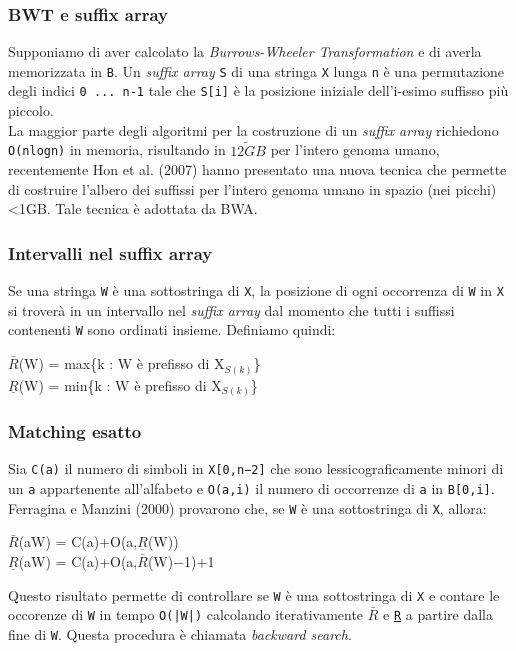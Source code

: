 \documentclass[conference]{IEEEtran}
\begin{document}
		\subsubsection{BWT e suffix array}
		Supponiamo di aver calcolato la \textit{Burrows-Wheeler Transformation} e di averla memorizzata in \texttt{B}. Un \textit{suffix array} \texttt{S} di una stringa \texttt{X} lunga \texttt{n} è una permutazione degli indici \texttt{0 ... n-1} tale che \texttt{S[i]} è la posizione iniziale dell'i-esimo suffisso più piccolo.\\

La maggior parte degli algoritmi per la costruzione di un \textit{suffix array} richiedono \texttt{O(nlogn)} in memoria, risultando in $\tilde{12GB}$ per l'intero genoma umano, recentemente Hon et al. (2007) hanno presentato una nuova tecnica che permette di costruire l'albero dei suffissi per l'intero genoma umano in spazio (nei picchi) <1GB. Tale tecnica è adottata da BWA.\\

		\subsubsection{Intervalli nel suffix array}
		Se una stringa \texttt{W} è una sottostringa di \texttt{X}, la posizione di ogni occorrenza di \texttt{W} in \texttt{X} si troverà in un intervallo nel \textit{suffix array} dal momento che tutti i suffissi contenenti \texttt{W} sono ordinati insieme. Definiamo quindi:\\
\begin{center}
$\bar{R}$(W) = max\{k : W è prefisso di X$_{S(k)}$\}\\
$\underline{R}$(W) = min\{k : W è prefisso di X$_{S(k)}$\}\\ 
\end{center}

		\subsubsection{Matching esatto}
		Sia \texttt{C(a)} il numero di simboli in \texttt{X[0,n−2]} che sono lessicograficamente minori di un \texttt{a} appartenente all'alfabeto e \texttt{O(a,i)} il numero di occorrenze di \texttt{a} in \texttt{B[0,i]}. Ferragina e Manzini (2000) provarono che, se \texttt{W} è una sottostringa di \texttt{X}, allora:
\begin{center}
$\bar{R}$(aW) = C(a)+O(a,$\underline{R}$(W))\\
$\underline{R}$(aW) = C(a)+O(a,$\bar{R}$(W)−1)+1
\end{center}
Questo risultato permette di controllare se \texttt{W} è una sottostringa di \texttt{X} e contare le occorenze di \texttt{W} in tempo \texttt{O(|W|)} calcolando iterativamente \texttt{$\bar{R}$} e \texttt{\underline{R}} a partire dalla fine di \texttt{W}. Questa procedura è chiamata \textit{backward search}.\\
\end{document}
